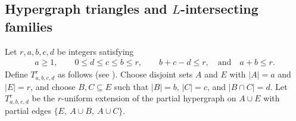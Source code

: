 \documentclass[10pt,a4paper]{article}
\theoremstyle{plain}
\theoremstyle{definition}
\theoremstyle{plain}
\begin{document}
\subsection{Hypergraph triangles and \texorpdfstring{$L$}{L}-intersecting families}

Let $r,a,b,c,d$ be integers satisfying
\begin{equation}\label{eq:first-assumptions}
\begin{gathered}
        a\ge1,
        \qquad 0\le d\le c\le b\le r,
        \qquad b+c-d\le r,
        \quad\text{and}\quad a+b\le r.
\end{gathered}
\end{equation}
Define $T^r_{a,b,c,d}$ as follows (see ).  Choose disjoint sets $A$ and $E$ with $|A|=a$ and $|E|=r$, and choose $B,C\subseteq E$ such that $|B|=b$, $|C|=c$, and $|B\cap C|=d$.  Let $T^r_{a,b,c,d}$ be the $r$-uniform extension of the partial hypergraph on $A\cup E$ with partial edges $\{E,~ A\cup B,~ A\cup C\}$. 
\end{document}
